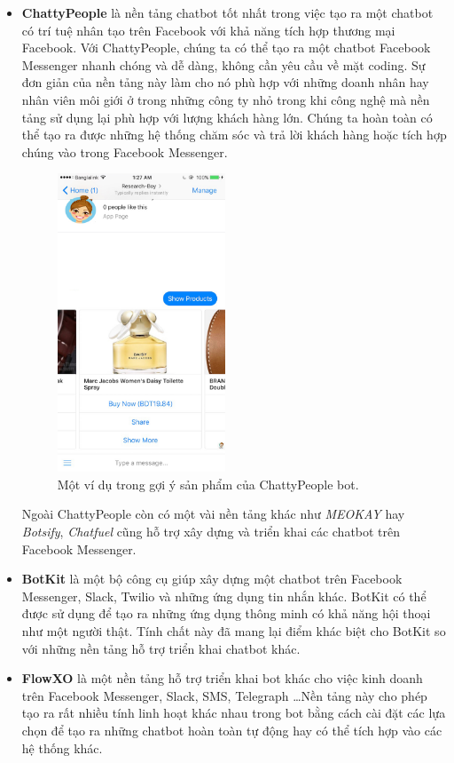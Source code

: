 \documentclass[12pt]{report}
\begin{document}
\begin{itemize}
	\item \textbf{ChattyPeople} là nền tảng chatbot tốt nhất trong việc tạo ra một chatbot có trí tuệ nhân tạo trên Facebook với khả năng tích hợp thương mại Facebook. Với ChattyPeople, chúng ta có thể tạo ra một chatbot Facebook Messenger nhanh chóng và dễ dàng, không cần yêu cầu về mặt coding. Sự đơn giản của nền tảng này làm cho nó phù hợp với những doanh nhân hay nhân viên môi giới ở trong những công ty nhỏ trong khi công nghệ mà nền tảng sử dụng lại phù hợp với lượng khách hàng lớn. Chúng ta hoàn toàn có thể tạo ra được những hệ thống chăm sóc và trả lời khách hàng hoặc tích hợp chúng vào trong Facebook Messenger.

	\begin{figure}[H]
	  \centering
	    \includegraphics[width=5cm]{Pics/Chap2/chatty-prople.jpg}
	  \caption{Một ví dụ trong gợi ý sản phẩm của ChattyPeople bot\cite{chattypeople}.}
	\end{figure}

Ngoài ChattyPeople còn có một vài nền tảng khác như \textit{MEOKAY} hay \textit{Botsify}, \textit{Chatfuel} cũng hỗ trợ xây dựng và triển khai các chatbot trên Facebook Messenger.

	\item \textbf{BotKit} là một bộ công cụ giúp xây dựng một chatbot trên Facebook Messenger, Slack, Twilio và những ứng dụng tin nhắn khác. BotKit có thể được sử dụng để tạo ra những ứng dụng thông minh có khả năng hội thoại như một người thật. Tính chất này đã mang lại điểm khác biệt cho BotKit so với những nền tảng hỗ trợ triển khai chatbot khác\cite{botkit}.

	\item \textbf{FlowXO} là một nền tảng hỗ trợ triển khai bot khác cho việc kinh doanh trên Facebook Messenger, Slack, SMS, Telegraph \ldots Nền tảng này cho phép tạo ra rất nhiều tính linh hoạt khác nhau trong bot bằng cách cài đặt các lựa chọn để tạo ra những chatbot hoàn toàn tự động hay có thể tích hợp vào các hệ thống khác\cite{flowxo}.
\end{itemize}
\end{document}
